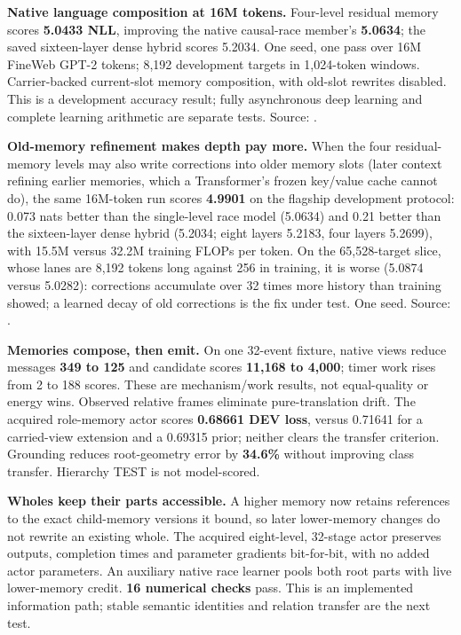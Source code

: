 \documentclass[10pt, a4 paper]{article}
\begin{document}
\textbf{Native language composition at 16M tokens.} Four-level residual memory scores \textbf{5.0433 NLL}, improving the native causal-race member's \textbf{5.0634}; the saved sixteen-layer dense hybrid scores 5.2034. One seed, one pass over 16M FineWeb GPT-2 tokens; 8,192 development targets in 1,024-token windows. Carrier-backed current-slot memory composition, with old-slot rewrites disabled. This is a development accuracy result; fully asynchronous deep learning and complete learning arithmetic are separate tests. Source: .

\textbf{Old-memory refinement makes depth pay more.} When the four residual-memory levels may also write corrections into older memory slots (later context refining earlier memories, which a Transformer's frozen key/value cache cannot do), the same 16M-token run scores \textbf{4.9901} on the flagship development protocol: 0.073 nats better than the single-level race model (5.0634) and 0.21 better than the sixteen-layer dense hybrid (5.2034; eight layers 5.2183, four layers 5.2699), with 15.5M versus 32.2M training FLOPs per token. On the 65,528-target slice, whose lanes are 8,192 tokens long against 256 in training, it is worse (5.0874 versus 5.0282): corrections accumulate over 32 times more history than training showed; a learned decay of old corrections is the fix under test. One seed. Source: .

\textbf{Memories compose, then emit.} On one 32-event fixture, native views reduce messages
\textbf{349 to 125} and candidate scores \textbf{11,168 to 4,000}; timer work rises from 2 to 188 scores.
These are mechanism/work results, not equal-quality or energy wins. Observed relative frames eliminate
pure-translation drift. The acquired role-memory actor scores \textbf{0.68661 DEV loss}, versus 0.71641
for a carried-view extension and a 0.69315 prior; neither clears the transfer criterion. Grounding reduces
root-geometry error by \textbf{34.6\%} without improving class transfer. Hierarchy TEST is not model-scored.

\textbf{Wholes keep their parts accessible.} A higher memory now retains references to the exact child-memory
versions it bound, so later lower-memory changes do not rewrite an existing whole. The acquired eight-level,
32-stage actor preserves outputs, completion times and parameter gradients bit-for-bit, with no added actor
parameters. An auxiliary native race learner pools both root parts with live lower-memory credit. \textbf{16 numerical checks}
pass. This is an implemented information path; stable semantic identities and relation transfer are the next test.
\end{document}
